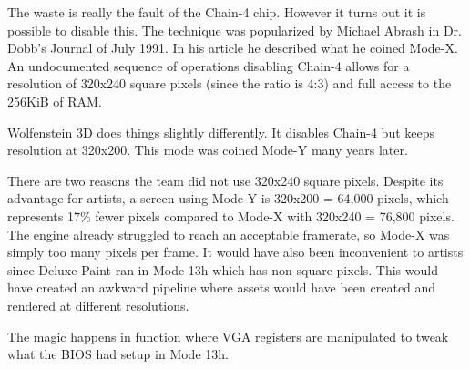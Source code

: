 \documentclass[book.tex]{subfiles}
\begin{document}
 \par
 The waste is really the fault of the Chain-4 chip. However it turns out it is possible to disable this. The technique was popularized by Michael Abrash in Dr. Dobb's Journal of July 1991. In his article he described what he coined Mode-X. An undocumented sequence of operations disabling Chain-4 allows for a resolution of 320x240 square pixels (since the ratio is 4:3) and full access to the 256KiB of RAM.\\
 \par
 Wolfenstein 3D does things slightly differently. It disables Chain-4 but keeps resolution at 320x200. This mode was coined Mode-Y many years later. \\
 \par
 There are two reasons the team did not use 320x240 square pixels. Despite its advantage for artists, a screen using Mode-Y is 320x200 = 64,000 pixels, which represents 17\% fewer pixels compared to Mode-X with 320x240 = 76,800 pixels. The engine already struggled to reach an acceptable framerate, so Mode-X was simply too many pixels per frame. It would have also been inconvenient to artists since Deluxe Paint ran in Mode 13h which has non-square pixels. This would have created an awkward pipeline where assets would have been created and rendered at different resolutions.
 \par
 \par
  \begin{minipage}{\textwidth}

\end{minipage}
 \par

The magic happens in function  where VGA registers are manipulated to tweak what the BIOS had setup in Mode 13h. \\

 \par
 \begin{minipage}{\textwidth}

\end{minipage}
\end{document}
